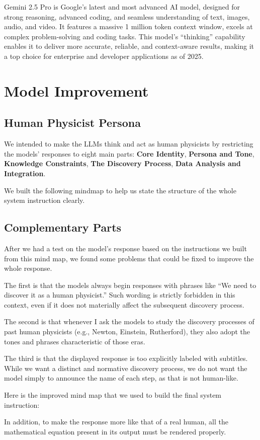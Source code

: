 \documentclass[12pt]{article}
\begin{document}
Gemini 2.5 Pro is Google’s latest and most advanced AI model, designed for strong reasoning, advanced coding, and seamless understanding of text, images, audio, and video. It features a massive 1 million token context window, excels at complex problem-solving and coding tasks. This model’s “thinking” capability enables it to deliver more accurate, reliable, and context-aware results, making it a top choice for enterprise and developer applications as of 2025. 

\section{Model Improvement}
\subsection{Human Physicist Persona}
We intended to make the LLMs think and act as human physicists by restricting the models' responses to eight main parts: \textbf{Core Identity}, \textbf{Persona and Tone}, \textbf{Knowledge Constraints}, \textbf{The Discovery Process}, \textbf{Data Analysis and Integration}.

We built the following mindmap to help us state the structure of the whole system instruction clearly. 

\subsection{Complementary Parts}
After we had a test on the model’s response based on the instructions we built from this mind map, we found some problems that could be fixed to improve the whole response.  

The first is that the models always begin responses with phrases like “We need to discover it as a human physicist.” Such wording is strictly forbidden in this context, even if it does not materially affect the subsequent discovery process.

The second is that whenever I ask the models to study the discovery processes of past human physicists (e.g., Newton, Einstein, Rutherford), they also adopt the tones and phrases characteristic of those eras.

The third is that the displayed response is too explicitly labeled with subtitles. While we want a distinct and normative discovery process, we do not want the model simply to announce the name of each step, as that is not human-like.
\par
\bigskip
Here is the improved mind map that we used to build the final system instruction:

\par
\bigskip
In addition, to make the response more like that of a real human, all the mathematical equation present in its output must be rendered properly.
\end{document}
